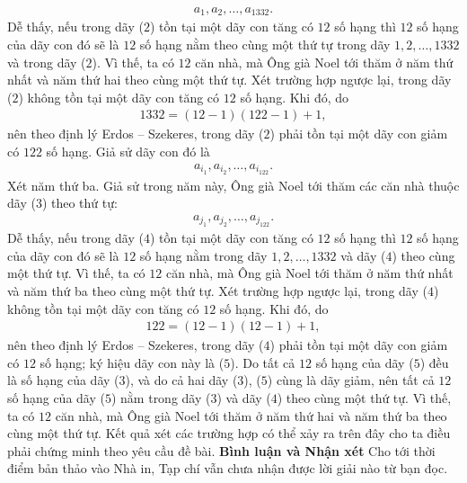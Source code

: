 \begin{multicols}{2}
	\begin{align*}
		{a_1},{a_2}, \ldots ,{a_{1332}}. \tag{$2$}
	\end{align*}
	Dễ thấy, nếu trong dãy ($2$) tồn tại một dãy con tăng có $12$ số hạng thì $12$ số hạng của dãy con đó sẽ là $12$ số hạng nằm theo cùng một thứ tự trong dãy $1, 2, \ldots, 1332$ và trong dãy ($2$). Vì thế, ta có $12$ căn nhà, mà Ông già Noel tới thăm ở năm thứ nhất và năm thứ hai theo cùng một thứ tự.
	\vskip 0.05cm
	Xét trường hợp ngược lại, trong dãy ($2$) không tồn tại một dãy con tăng có $12$ số hạng.
	\vskip 0.05cm
	Khi đó, do
	\begin{align*}
		1332 = (12 - 1)(122 - 1) + 1,
	\end{align*}
	nên theo định lý Erdos -- Szekeres, trong dãy ($2$) phải tồn tại một dãy con giảm có $122$ số hạng. Giả sử dãy con đó là
	\begin{align*}
		{a_{{i_1}}},{a_{{i_2}}}, \ldots ,{a_{{i_{122}}}}. \tag{$3$}
	\end{align*}
	Xét năm thứ ba. Giả sử trong năm này, Ông già Noel tới thăm các căn nhà thuộc dãy ($3$) theo thứ tự:
	\begin{align*}
		{a_{{j_1}}},{a_{{j_2}}}, \ldots ,{a_{{j_{122}}}}. \tag{$4$}
	\end{align*}
	Dễ thấy, nếu trong dãy ($4$) tồn tại một dãy con tăng có $12$ số hạng thì $12$ số hạng của dãy con đó sẽ là $12$ số hạng nằm trong dãy $1, 2, \ldots, 1332$ và dãy ($4$) theo cùng một thứ tự. Vì thế, ta có $12$ căn nhà, mà Ông già Noel tới thăm ở năm thứ nhất và năm thứ ba theo cùng một thứ tự.
	\vskip 0.05cm
	Xét trường hợp ngược lại, trong dãy ($4$) không tồn tại một dãy con tăng có $12$ số hạng.
	\vskip 0.05cm
	Khi đó, do
	\begin{align*}
		122 = (12 - 1)(12 - 1) + 1,
	\end{align*}
	nên theo định lý Erdos -- Szekeres, trong dãy ($4$) phải tồn tại một dãy con giảm có $12$ số hạng; ký hiệu dãy con này là ($5$).
	\vskip 0.05cm
	Do tất cả $12$ số hạng của dãy ($5$) đều là số hạng của dãy ($3$), và do cả hai dãy ($3$), ($5$) cùng là dãy giảm, nên tất cả $12$ số hạng của dãy ($5$) nằm trong dãy ($3$) và dãy ($4$) theo cùng một thứ tự. Vì thế, ta có $12$ căn nhà, mà Ông già Noel tới thăm ở năm thứ hai và năm thứ ba theo cùng một thứ tự.
	\vskip 0.05cm
	Kết quả xét các trường hợp có thể xảy ra trên đây cho ta điều phải chứng minh theo yêu cầu đề bài.
	\vskip 0.05cm
	\textbf{\color{thachthuctoanhoc}Bình luận và Nhận xét}
	\vskip 0.05cm
	Cho tới thời điểm bản thảo vào Nhà in, Tạp chí vẫn chưa nhận được lời giải nào từ bạn đọc.

\end{multicols}
